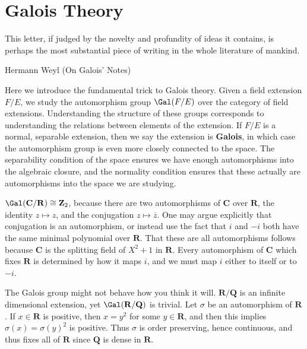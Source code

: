 \chapter{Galois Theory}

\epigraph{This letter, if judged by the novelty and profundity of ideas it contains, is perhaps the most substantial piece of writing in the whole literature of mankind.}{Hermann Weyl (On Galois' Notes)}

Here we introduce the fundamental trick to Galois theory. Given a field extension $F/E$, we study the automorphism group $\Gal(F/E)$ over the category of field extensions. Understanding the structure of these groups corresponds to understanding the relations between elements of the extension. If $F/E$ is a normal, separable extension, then we say the extension is {\bf Galois}, in which case the automorphism group is even more closely connected to the space. The separability condition of the space ensures we have enough automorphisms into the algebraic closure, and the normality condition ensures that these actually are automorphisms into the space we are studying.

\begin{example}
    $\Gal(\mathbf{C}/\mathbf{R}) \cong \mathbf{Z}_2$, because there are two automorphisms of $\mathbf{C}$ over $\mathbf{R}$, the identity $z \mapsto z$, and the conjugation $z \mapsto \overline{z}$. One may argue explicitly that conjugation is an automorphism, or instead use the fact that $i$ and $-i$ both have the same minimal polynomial over $\mathbf{R}$. That these are all automorphisms follows because $\mathbf{C}$ is the splitting field of $X^2 + 1$ in $\mathbf{R}$. Every automorphism of $\mathbf{C}$ which fixes $\mathbf{R}$ is determined by how it maps $i$, and we must map $i$ either to itself or to $-i$.
\end{example}

\begin{example}
    The Galois group might not behave how you think it will. $\mathbf{R}/\mathbf{Q}$ is an infinite dimensional extension, yet $\Gal(\mathbf{R}/\mathbf{Q})$ is trivial. Let $\sigma$ be an automorphism of $\mathbf{R}$. If $x \in \mathbf{R}$ is positive, then $x = y^2$ for some $y \in \mathbf{R}$, and then this implies $\sigma(x) = \sigma(y)^2$ is positive. Thus $\sigma$ is order preserving, hence continuous, and thus fixes all of $\mathbf{R}$ since $\mathbf{Q}$ is dense in $\mathbf{R}$.
\end{example}

